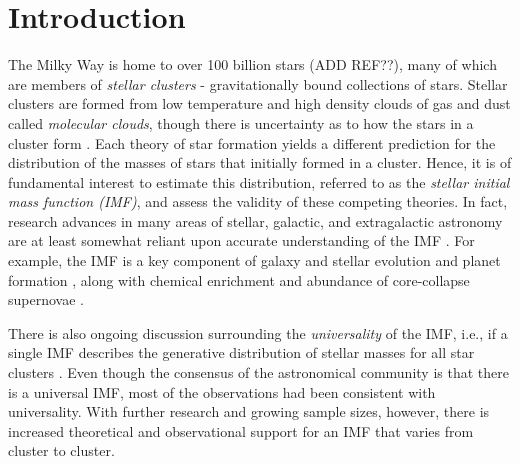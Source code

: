 \documentclass[12pt]{article}
\begin{document}
\section{Introduction}
\label{introSec}

The Milky Way is home to over 100 billion stars {\color{red} (ADD REF??)}, many of which 
are members of \emph{stellar clusters} - gravitationally bound collections of stars. 
Stellar clusters are formed from low temperature and high density clouds of gas and dust 
called \emph{molecular clouds}, though there 
is uncertainty as to how the stars in a cluster form \citep{Beccari2017}. 
Each theory of star formation yields a different prediction for the distribution
of the masses of stars that initially formed in a cluster. Hence, it is of fundamental 
interest to estimate this distribution, referred to as the \emph{stellar initial mass function (IMF)},
and assess the validity of these competing theories.
In fact, research advances in many areas of stellar, galactic, and extragalactic astronomy are at 
least somewhat reliant upon accurate understanding of the IMF \citep{bastian2010}.
For example, the IMF is a key
component of galaxy and stellar evolution and planet formation \citep{bally2005, bastian2010, Shetty2014}, 
along with chemical enrichment and abundance of core-collapse supernovae \citep{weisz13}.

There is also ongoing discussion surrounding the {\it universality} of the IMF, i.e.,
if a single IMF describes the generative distribution of stellar masses for all
star clusters \citep{bastian2010}. Even though the consensus of the astronomical community is that
there is a universal IMF, most of the observations had been consistent with universality.
With further research and growing sample sizes, however, there is increased theoretical 
\citep{Dib2010,bonnell2006}
and observational
\citep{Treu2010, Spiniello2014,Dib2017,Geha2013}
support for an IMF that varies from cluster to cluster.
\end{document}
